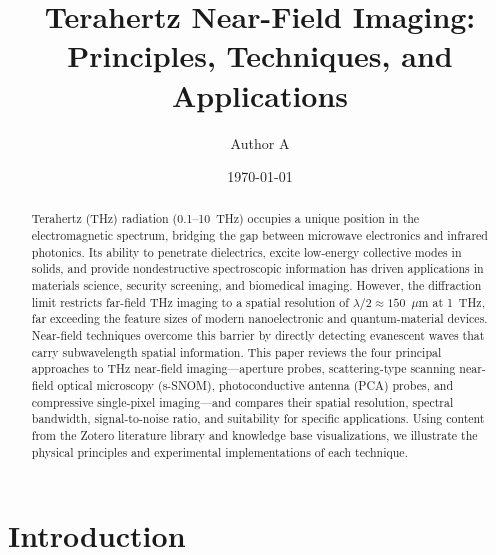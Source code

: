 \documentclass[reprint,superscriptaddress,amsmath,amssymb]{revtex4-2}
\begin{document}

\title{Terahertz Near-Field Imaging: Principles, Techniques, and Applications}

\author{Author A}

\date{\today}

\begin{abstract}
Terahertz (THz) radiation (0.1--10~THz) occupies a unique position in the electromagnetic spectrum, bridging the gap between microwave electronics and infrared photonics. Its ability to penetrate dielectrics, excite low-energy collective modes in solids, and provide nondestructive spectroscopic information has driven applications in materials science, security screening, and biomedical imaging. However, the diffraction limit restricts far-field THz imaging to a spatial resolution of $\lambda/2 \approx 150$~$\mu$m at 1~THz, far exceeding the feature sizes of modern nanoelectronic and quantum-material devices. Near-field techniques overcome this barrier by directly detecting evanescent waves that carry subwavelength spatial information. This paper reviews the four principal approaches to THz near-field imaging---aperture probes, scattering-type scanning near-field optical microscopy (s-SNOM), photoconductive antenna (PCA) probes, and compressive single-pixel imaging---and compares their spatial resolution, spectral bandwidth, signal-to-noise ratio, and suitability for specific applications. Using content from the Zotero literature library and knowledge base visualizations, we illustrate the physical principles and experimental implementations of each technique.
\end{abstract}


\maketitle

\section{Introduction}
\end{document}
